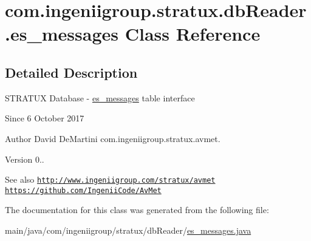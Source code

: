 \hypertarget{classcom_1_1ingeniigroup_1_1stratux_1_1db_reader_1_1es__messages}{}\section{com.\+ingeniigroup.\+stratux.\+db\+Reader.\+es\+\_\+messages Class Reference}
\label{classcom_1_1ingeniigroup_1_1stratux_1_1db_reader_1_1es__messages}


\subsection{Detailed Description}
S\+T\+R\+A\+T\+UX Database -\/ \hyperlink{classcom_1_1ingeniigroup_1_1stratux_1_1db_reader_1_1es__messages}{es\+\_\+messages} table interface

\begin{DoxySince}{Since}
6 October 2017 
\end{DoxySince}
\begin{DoxyAuthor}{Author}
David De\+Martini  com.\+ingeniigroup.\+stratux.\+avmet. 
\end{DoxyAuthor}
\begin{DoxyVersion}{Version}
0.. 
\end{DoxyVersion}
\begin{DoxySeeAlso}{See also}
\href{http://www.ingeniigroup.com/stratux/avmet}{\tt http\+://www.\+ingeniigroup.\+com/stratux/avmet}  \href{https://github.com/IngeniiCode/AvMet}{\tt https\+://github.\+com/\+Ingenii\+Code/\+Av\+Met} 
\end{DoxySeeAlso}


The documentation for this class was generated from the following file\+:\begin{DoxyCompactItemize}
\item 
main/java/com/ingeniigroup/stratux/db\+Reader/\hyperlink{es__messages_8java}{es\+\_\+messages.\+java}\end{DoxyCompactItemize}
